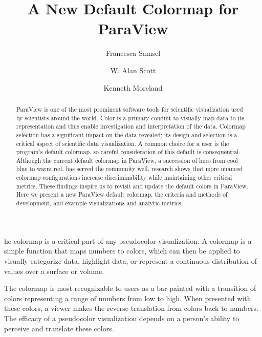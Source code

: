 \documentclass{IEEEcsmag}
\begin{document}

\title{A New Default Colormap for ParaView}

\author{Francesca Samsel}

\author{W. Alan Scott}

\author{Kenneth Moreland}




\begin{abstract}
ParaView is one of the most prominent software tools for scientific visualization used by scientists around the world.
Color is a primary conduit to visually map data to its representation and thus enable investigation and interpretation of the data.
Colormap selection has a significant impact on the data revealed; its design and selection is a critical aspect of scientific data visualization.
A common choice for a user is the program's default colormap, so careful consideration of this default is consequential.
Although the current default colormap in ParaView, a succession of hues from cool blue to warm red, has served the community well, research shows that more nuanced colormap configurations increase discriminability while maintaining other critical metrics. 
These findings inspire us to revisit and update the default colors in ParaView.
Here we present a new ParaView default colormap, the criteria and methods of development, and example visualizations and analytic metrics.
\end{abstract}

\maketitle

he colormap is a critical part of any pseudocolor visualization.
A colormap is a simple function that maps numbers to colors, which can then be applied to visually categorize data, highlight data, or represent a continuous distribution of values over a surface or volume.

The colormap is most recognizable to users as a bar painted with a transition of colors representing a range of numbers from low to high.  
When presented with these colors, a viewer makes the reverse translation from colors back to numbers. The efficacy of a pseudocolor visualization depends on a person's ability to perceive and translate these colors.  
\end{document}
